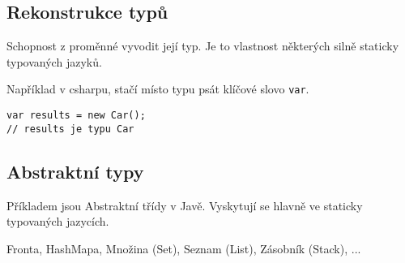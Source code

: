 \subsection{Rekonstrukce typů}
Schopnost z proměnné vyvodit její typ. Je to vlastnost některých silně staticky typovaných jazyků.

\noindent \textit{}

Například v csharpu, stačí místo typu psát klíčové slovo \texttt{var}.

\begin{verbatim}
var results = new Car();
// results je typu Car
\end{verbatim}

\subsection{Abstraktní typy}
Příkladem jsou Abstraktní třídy v Javě. Vyskytují se hlavně ve staticky typovaných jazycích.

Fronta, HashMapa, Množina (Set), Seznam (List), Zásobník (Stack), ...
